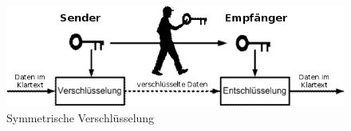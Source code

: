 \begin{figure}[ht]
\begin{center}
\includegraphics[width=15cm]{images/symmetrischeVerschluesselung.png}
\caption[Symmetrische Verschlüsselung Quelle:\newline ~~~~http://www.internet-sicherheit.de/typo3temp/pics/Schluesselaustausch\newline\_durch\_einen\_Kurier\_94b1b7125d.png]{Symmetrische Verschlüsselung}%
\label{fig:symVersch}
\end{center}
\end{figure}
%
